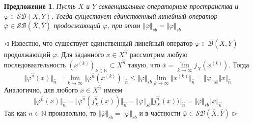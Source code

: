 \documentclass[12pt]{article}
\newtheorem{proposition}[theorem]{Предложение}
\newenvironment{proof}{\par $\triangleleft$}{$\triangleright$}
\begin{document}
\begin{proposition}\label{PrExtLinOpByCont} Пусть $X$ и $Y$ секвенциальные операторные пространства и $\varphi\in\mathcal{SB}(X,Y)$. Тогда существует единственный линейный оператор $\overline{\varphi}\in\mathcal{SB}(\overline{X},\overline{Y})$ продолжающий $\varphi$, при этом $\Vert \overline{\varphi}\Vert_{sb}=\Vert \varphi\Vert_{sb}$
\end{proposition}
\begin{proof}
Известно, что существует единственный линейный оператор $\overline{\varphi}\in\mathcal{B}(\overline{X},\overline{Y})$ продолжающий $\varphi$. Для заданного $x\in X^{\wideparen{n}}$ рассмотрим любую последоваательность $(x^{(k)})_{k\in\mathbb{N}}\subset X^{\wideparen{n}}$ такую, что $\overline{x}=\lim\limits_{k\to\infty} j_X(x^{(k)})$. Тогда
$$
\Vert\overline{\varphi}^{\wideparen{n}}(\overline{x})\Vert_{\wideparen{n}}
=\lim\limits_{k\to\infty}\Vert \varphi^{\wideparen{n}}(x^{(k)})\Vert_{\wideparen{n}}
\leq\Vert \varphi\Vert_{sb}\lim\limits_{k\to\infty}\Vert x^{(k)}\Vert_{\wideparen{n}}
=\Vert \varphi\Vert_{sb}\Vert \overline{x}\Vert_{\wideparen{n}}
$$
Аналогично, для любого $x\in X^{\wideparen{n}}$ имеем
$$
\Vert \varphi^{\wideparen{n}}(x)\Vert_{\wideparen{n}}
=\Vert\overline{\varphi}^{\wideparen{n}}(j_X^{\wideparen{n}}(x))\Vert_{\wideparen{n}}
=\Vert\overline{\varphi}\Vert_{sb}\Vert j_X^{\wideparen{n}}(x))\Vert_{\wideparen{n}}
=\Vert\overline{\varphi}\Vert_{sb}\Vert x\Vert_{\wideparen{n}}
$$
Так как $n\in\mathbb{N}$ произвольно, то $\Vert \overline{\varphi}\Vert_{sb}=\Vert \varphi\Vert_{sb}$ и в частности $\overline{\varphi}\in\mathcal{SB}(\overline{X},\overline{Y})$
\end{proof}
\end{document}
